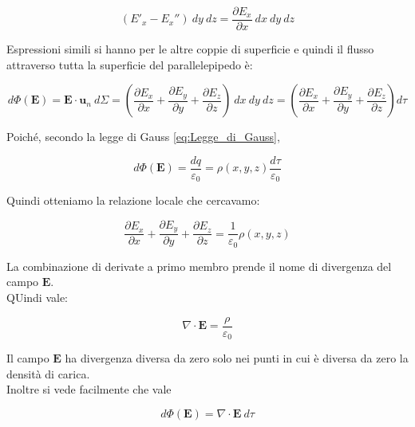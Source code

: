 \begin{equation*}
    (E'_x - E_x '') \ dy \ dz = \frac{\partial E_x}{\partial x} \ dx \ dy \ dz
\end{equation*}

Espressioni simili si hanno per le altre coppie di superficie e quindi il flusso attraverso tutta la superficie del parallelepipedo è:

\begin{equation*}
    d \Phi (\mathbf{E}) = \mathbf{E} \cdot \mathbf{u}_n \ d \Sigma  = \left ( \frac{\partial E_x}{\partial x} + \frac{\partial E_y}{\partial y} + \frac{\partial E_z}{\partial z} \right ) \ dx \ dy \ dz = \left ( \frac{\partial E_x}{\partial x} + \frac{\partial E_y}{\partial y} + \frac{\partial E_z}{\partial z} \right ) d \tau
\end{equation*}

Poiché, secondo la legge di Gauss \ref{eq:Legge_di_Gauss},

\begin{equation*}
    d \Phi (\mathbf{E}) = \frac{dq}{\varepsilon_0} = \rho (x,y,z) \frac{d \tau}{\varepsilon_0}
\end{equation*}

Quindi otteniamo la relazione locale che cercavamo:

\begin{equation}
    \frac{\partial E_x}{\partial x} + \frac{\partial E_y}{\partial y} + \frac{\partial E_z}{\partial z} = \frac{1}{\varepsilon_0} \rho (x,y,z)
\end{equation}

La combinazione di derivate a primo membro prende il nome di  divergenza del campo $\mathbf{E}$. \\
QUindi vale:

\begin{tcolorbox}[colback=yellow!10!white, colframe=orange!70!black, boxrule=0.8pt]
\begin{equation}
    \nabla \cdot \mathbf{E} = \frac{\rho}{\varepsilon_0}
    \label{eq:Gauss_forma_differenziale}
\end{equation}
\end{tcolorbox}

Il campo $\mathbf{E}$ ha divergenza diversa da zero solo nei punti in cui è diversa da zero la densità di carica. \\

Inoltre si vede facilmente che vale 

\begin{tcolorbox}[colback=yellow!10!white, colframe=orange!70!black, boxrule=0.8pt]
\begin{equation}
    d \Phi (\mathbf{E}) = \nabla \cdot \mathbf{E} \ d \tau
\end{equation}
\end{tcolorbox}

